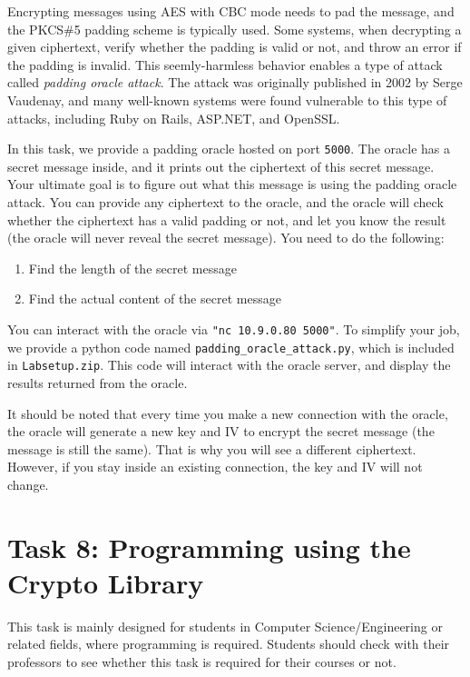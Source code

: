 Encrypting messages using AES with CBC mode needs to
pad the message, and the PKCS\#5 padding scheme is typically used.
Some systems, when decrypting a given ciphertext,
verify whether the padding is valid or not,  
and throw an error if the padding is invalid. This 
seemly-harmless behavior enables a type of attack 
called \textit{padding oracle attack}.
The attack was originally published in 2002 by Serge Vaudenay, and 
many well-known systems were found vulnerable to this type of 
attacks, including Ruby on Rails, ASP.NET, and OpenSSL. 


In this task, we provide a padding oracle hosted on port \texttt{5000}.
The oracle has a secret message inside, and it 
prints out the ciphertext of this secret message.
Your ultimate goal is to figure out what this message is
using the padding oracle attack. 
You can provide any ciphertext to the oracle, and the
oracle will check whether the ciphertext has a valid padding or not, and 
let you know the result (the oracle will never reveal the 
secret message). You need to do the following:

\begin{enumerate}
  \item Find the length of the secret message
  \item Find the actual content of the secret message
\end{enumerate}

You can interact with the oracle via \texttt{"nc 10.9.0.80 5000"}.
To simplify your job, we provide a python code named \texttt{padding\_oracle\_attack.py},
which is included in \texttt{Labsetup.zip}. 
This code will interact with the oracle server, and display the results
returned from the oracle.  

It should be noted that every time you make a new connection with the 
oracle, the oracle will generate a new key and IV to encrypt the 
secret message (the message is still the same). That is why
you will see a different ciphertext. 
However, if you stay inside an existing connection, 
the key and IV will not change. 


\section{Task 8: Programming using the Crypto Library}

This task is mainly designed for students in Computer Science/Engineering
or related fields, where programming is required. Students should
check with their professors to see whether this task is required
for their courses or not.


